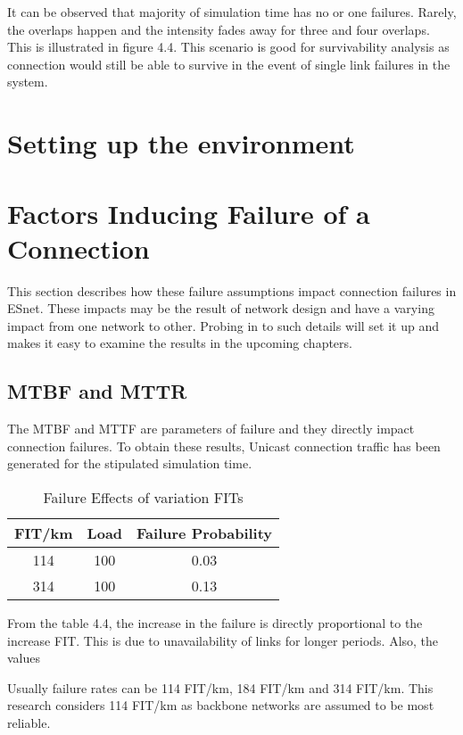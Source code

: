 \indent It can be observed that majority of simulation time has no or one failures. Rarely, the overlaps happen and the intensity fades away for three and four overlaps. This is illustrated in figure 4.4. This scenario is good for survivability analysis as connection would still be able to survive in the event of single link failures in the system.

\section {Setting up the environment}

\section {Factors Inducing Failure of a Connection}
This section describes how these failure assumptions impact connection failures in ESnet. These impacts may be the result of network design and have a varying impact from one network to other. Probing in to such details will set it up and makes it easy to examine the results in the upcoming chapters.

\subsection {MTBF and MTTR}
The MTBF and MTTF are parameters of failure and they directly impact connection failures. To obtain these results, Unicast connection traffic has been generated for the stipulated simulation time.
			
\begin{table}[!htbp]
\centering
\caption{Failure Effects of variation FITs}
 	\begin{tabular}{|c|c|c|}
	\hline\hline
	\textbf{FIT/km} & \textbf{Load} & \textbf{Failure Probability}\\
	\hline
	114&100&0.03\\
	314&100&0.13\\
	\hline
	\end{tabular}
\end{table}

From the table 4.4, the increase in the failure is directly proportional to the increase FIT. This is due to unavailability of links for longer periods. Also, the values 

Usually failure rates can be 114 FIT/km, 184 FIT/km and 314 FIT/km. This research considers 114 FIT/km as backbone networks are assumed to be most reliable.

